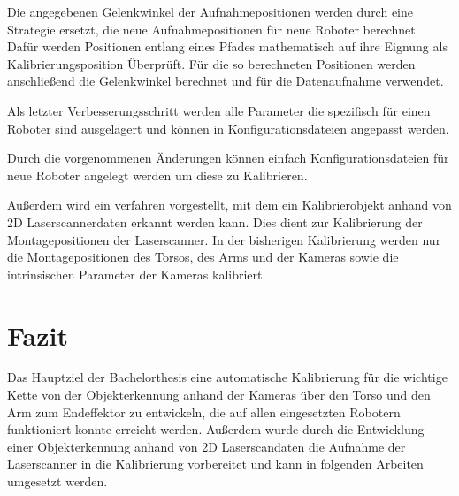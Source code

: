 \documentclass{scrartcl}
\begin{document}
Die angegebenen Gelenkwinkel der Aufnahmepositionen werden durch eine Strategie
ersetzt, die neue Aufnahmepositionen für neue Roboter berechnet. Dafür werden
Positionen entlang eines Pfades mathematisch auf ihre Eignung als
Kalibrierungsposition Überprüft. Für die so berechneten Positionen werden 
anschließend die Gelenkwinkel berechnet und für die Datenaufnahme verwendet.

Als letzter Verbesserungsschritt werden alle Parameter die spezifisch für einen
Roboter sind ausgelagert und können in Konfigurationsdateien angepasst werden.

Durch die vorgenommenen Änderungen können einfach Konfigurationsdateien für neue
Roboter angelegt werden um diese zu Kalibrieren.


Außerdem wird ein verfahren vorgestellt, mit dem ein Kalibrierobjekt anhand
von 2D Laserscannerdaten erkannt werden kann. Dies dient zur Kalibrierung der
Montagepositionen der Laserscanner. In der bisherigen Kalibrierung werden nur
die Montagepositionen des Torsos, des Arms und der Kameras sowie die intrinsischen
Parameter der Kameras kalibriert.


\section{Fazit}

Das Hauptziel der Bachelorthesis eine automatische Kalibrierung für die
wichtige Kette von der Objekterkennung anhand der Kameras über den Torso und
den Arm zum Endeffektor zu entwickeln, die auf allen eingesetzten Robotern
funktioniert konnte erreicht werden.
Außerdem wurde durch die Entwicklung einer Objekterkennung anhand von 2D 
Laserscandaten die Aufnahme der Laserscanner in die Kalibrierung vorbereitet
und kann in folgenden Arbeiten umgesetzt werden.
\end{document}
